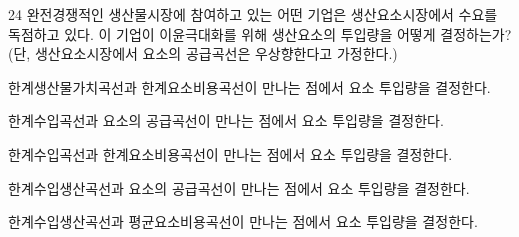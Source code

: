 \begin{question}{24}
완전경쟁적인 생산물시장에 참여하고 있는 어떤 기업은 생산요소시장에서 수요를 독점하고 있다. 이 기업이 이윤극대화를 위해 생산요소의 투입량을 어떻게 결정하는가? (단, 생산요소시장에서 요소의 공급곡선은 우상향한다고 가정한다.)
\begin{choices}
  \item 한계생산물가치곡선과 한계요소비용곡선이 만나는 점에서 요소 투입량을 결정한다.
  \item 한계수입곡선과 요소의 공급곡선이 만나는 점에서 요소 투입량을 결정한다.
  \item 한계수입곡선과 한계요소비용곡선이 만나는 점에서 요소 투입량을 결정한다.
  \item 한계수입생산곡선과 요소의 공급곡선이 만나는 점에서 요소 투입량을 결정한다.
  \item 한계수입생산곡선과 평균요소비용곡선이 만나는 점에서 요소 투입량을 결정한다.
\end{choices}
\end{question}
